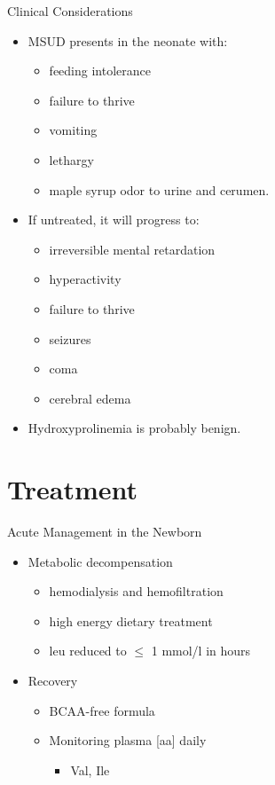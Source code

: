 \documentclass[presentation, smaller]{beamer}
\begin{document}
\begin{frame}[label={sec:orgheadline18}]{Clinical Considerations}
\begin{itemize}
\item MSUD presents in the neonate with:
\begin{itemize}
\item feeding intolerance
\item failure to thrive
\item vomiting
\item lethargy
\item maple syrup odor to urine and cerumen.
\end{itemize}
\item If untreated, it will progress to:
\begin{itemize}
\item irreversible mental retardation
\item hyperactivity
\item failure to thrive
\item seizures
\item coma
\item cerebral edema
\end{itemize}
\item Hydroxyprolinemia is probably benign.
\end{itemize}
\end{frame}

\section{Treatment}
\label{sec:orgheadline23}
\begin{frame}[label={sec:orgheadline20}]{Acute Management in the Newborn}
\begin{itemize}
\item Metabolic decompensation
\begin{itemize}
\item hemodialysis and hemofiltration
\item high energy dietary treatment
\item leu reduced to \(\le\) 1 mmol/l in hours
\end{itemize}
\item Recovery
\begin{itemize}
\item BCAA-free formula
\item Monitoring plasma [aa] daily
\begin{itemize}
\item Val, Ile
\end{itemize}
\end{itemize}
\end{itemize}
\end{frame}
\end{document}

